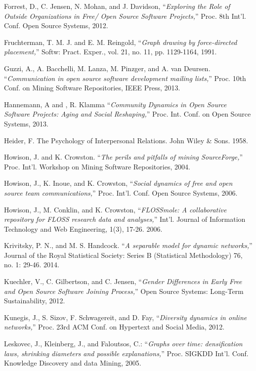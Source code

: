 \begin{thebibliography}{99.}
 Forrest, D., C. Jensen, N. Mohan, and J. Davidson, ``\textit{Exploring the Role of Outside Organizations in Free/ Open Source Software Projects,}'' Proc. 8th Int'l. Conf. Open Source Systems, 2012.

 Fruchterman, T. M. J. and E. M. Reingold, ``\textit{Graph drawing by force-directed placement,}'' Softw: Pract. Exper., vol. 21, no. 11, pp. 1129-1164, 1991.

 Guzzi, A., A. Bacchelli, M. Lanza, M. Pinzger, and A. van Deursen. ``\textit{Communication in open source software development mailing lists,}'' Proc. 10th Conf. on Mining Software Repositories, IEEE Press, 2013.

 Hannemann, A and , R. Klamma ``\textit{Community Dynamics in Open Source Software Projects: Aging and Social Reshaping,}'' Proc. Int. Conf. on Open Source Systems, 2013. 

 Heider, F. The Psychology of Interpersonal Relations. John Wiley \& Sons. 1958.

 Howison, J. and K. Crowston. ``\textit{The perils and pitfalls of mining SourceForge,}'' Proc. Int'l. Workshop on Mining Software Repositories, 2004.  

 Howison, J., K. Inoue, and K. Crowston, ``\textit{Social dynamics of free and open source team communications,}'' Proc. Int'l. Conf. Open Source Systems, 2006.  

 Howison, J., M. Conklin, and K. Crowston, ``\textit{FLOSSmole: A collaborative repository for FLOSS research data and analyses,}'' Int'l. Journal of Information Technology and Web Engineering, 1(3), 17-26. 2006.

 Krivitsky, P. N., and M. S. Handcock. ``\textit{A separable model for dynamic networks,}'' Journal of the Royal Statistical Society: Series B (Statistical Methodology) 76, no. 1: 29-46. 2014.

 Kuechler, V., C. Gilbertson, and C. Jensen, ``\textit{Gender Differences in Early Free and Open Source Software Joining Process,}'' Open Source Systems: Long-Term Sustainability, 2012. 

 Kunegis, J., S. Sizov, F. Schwagereit, and D. Fay, ``\textit{Diversity dynamics in online networks,}'' Proc. 23rd ACM Conf. on Hypertext and Social Media, 2012. 

 Leskovec, J., Kleinberg, J., and Faloutsos, C.: ``\textit{Graphs over time: densification laws, shrinking diameters and possible explanations,}'' Proc. SIGKDD Int'l. Conf. Knowledge Discovery and data Mining, 2005. 


\end{thebibliography}
